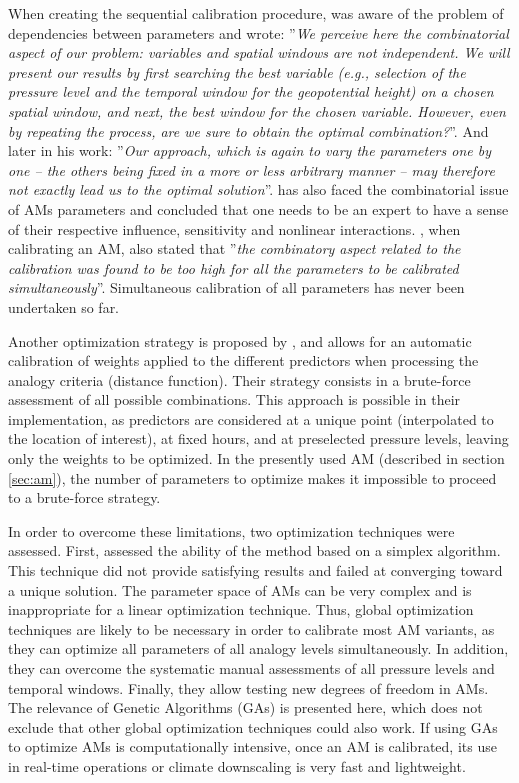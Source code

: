\documentclass{ametsoc}
\begin{document}
When creating the sequential calibration procedure, \citet{Bontron2004} was aware of the problem of dependencies between parameters and wrote: ''\textit{We perceive here the combinatorial aspect of our problem: variables and spatial windows are not independent. We will present our results by first searching the best variable (e.g., selection of the pressure level and the temporal window for the geopotential height) on a chosen spatial window, and next, the best window for the chosen variable. However, even by repeating the process, are we sure to obtain the optimal combination?}''. And later in his work: ''\textit{Our approach, which is again to vary the parameters one by one -- the others being fixed in a more or less arbitrary manner -- may therefore not exactly lead us to the optimal solution}''. \citet{Bliefernicht2010} has also faced the combinatorial issue of AMs parameters and concluded that one needs to be an expert to have a sense of their respective influence, sensitivity and nonlinear interactions. \citet{BenDaoud2010}, when calibrating an AM, also stated that ''\textit{the combinatory aspect related to the calibration was found to be too high for all the parameters to be calibrated simultaneously}''. Simultaneous calibration of all parameters has never been undertaken so far. 

Another optimization strategy is proposed by \citet{Junk2015}, and allows for an automatic calibration of weights applied to the different predictors when processing the analogy criteria (distance function). Their strategy consists in a brute-force assessment of all possible combinations. This approach is possible in their implementation, as predictors are considered at a unique point (interpolated to the location of interest), at fixed hours, and at preselected pressure levels, leaving only the weights to be optimized. In the presently used AM (described in section \ref{sec:am}), the number of parameters to optimize makes it impossible to proceed to a brute-force strategy.

In order to overcome these limitations, two optimization techniques were assessed. First, \citet{Horton2012a} assessed the ability of the \citet{Nelder1965a} method based on a simplex algorithm. This technique did not provide satisfying results and failed at converging toward a unique solution. The parameter space of AMs can be very complex and is inappropriate for a linear optimization technique. Thus, global optimization techniques are likely to be necessary in order to calibrate most AM variants, as they can optimize all parameters of all analogy levels simultaneously. In addition, they can overcome the systematic manual assessments of all pressure levels and temporal windows. Finally, they allow testing new degrees of freedom in AMs. The relevance of Genetic Algorithms (GAs) is presented here, which does not exclude that other global optimization techniques could also work. If using GAs to optimize AMs is computationally intensive, once an AM is calibrated, its use in real-time operations or climate downscaling is very fast and lightweight.
\end{document}
